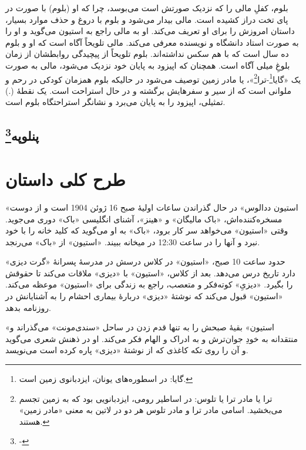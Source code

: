 \documentclass[12pt]{book}
\newcommand{\noun}[1]{«{#1}»}
\begin{document}
    بلوم، کفلِ مالی را که نزدیک صورتش است می‌بوسد، چرا که او (بلوم) با صورت در پای تخت دراز کشیده است. مالی بیدار می‌شود و بلوم با دروغ و حذف موارد بسیار، داستان امروزش را برای او تعریف می‌کند. او به مالی راجع به استیون می‌گوید و او را به صورت استاد دانشگاه و نویسنده معرفی می‌کند. مالی تلویحاً آگاه است  که او و بلوم ده سال است که با هم سکس نداشته‌اند. بلوم تلویحاً از پیچیدگی روابطشان از زمان بلوغِ میلی آگاه است. همچنان که اپیزود به پایان خود نزدیک می‌شود، مالی به صورت یک «گایا\footnote{گایا: در اسطوره‌های یونان، ایزدبانوی زمین است.}-ترا\footnote{ترا یا مادر ترا یا تلوس: در اساطیر رومی، ایزدبانویی بود که به زمین تجسم می‌بخشید. اسامی مادر ترا و مادر تلوس هر دو در لاتین به معنی «مادر زمین» هستند.}»، یا مادر زمین توصیف می‌شود در حالیکه بلوم همزمان کودکی در رحم و ملوانی است که از سیر و سفرهایش برگشته و در حال استراحت است. یک نقطۀ (.) تمثیلی، اپیزود را به پایان می‌برد و نشانگر استراحتگاه بلوم است.

    \chapter[پنلوپه]{پنلوپه\protect\footnote{-}}\label{ep:18}

    \part{طرح کلی داستان}
    \noun{استیون ددالوس} در حال گذراندن ساعات اولیۀ صبح 16 ژوئن 1904 است و از دوست مسخره‌کننده‌اش، \noun{باک مالیگان} و \noun{هینز}، آشنای انگلیسی \noun{باک} دوری می‌جوید. وقتی \noun{استیون} می‌خواهد سر کار برود، \noun{باک} به او می‌گوید که کلید خانه را با خود نبرد و آنها را در ساعت 12:30 در میخانه ببیند. \noun{استیون} از \noun{باک} می‌رنجد.

    حدود ساعت 10 صبح، \noun{استیون} در کلاس درسش در مدرسۀ پسرانۀ \noun{گرت دیزی} دارد تاریخ درس می‌دهد. بعد از کلاس، \noun{استیون} با \noun{دیزی} ملاقات می‌کند تا حقوقش را بگیرد. \noun{دیزیِ} کوته‌فکر و متعصب، راجع به زندگی برای \noun{استیون} موعظه می‌کند. \noun{استیون} قبول می‌کند که نوشتۀ \noun{دیزی} دربارۀ بیماری احشام را به آشنایانش در روزنامه بدهد.

    \noun{استیون} بقیۀ صبحش را به تنها قدم زدن در ساحل \noun{سندی‌مونت} می‌گذراند و منتقدانه به خودِ جوان‌ترش و به ادراک و الهام فکر می‌کند. او در ذهنش شعری می‌گوید و آن را روی تکه کاغذی که از نوشتۀ \noun{دیزی} پاره کرده است می‌نویسد.
\end{document}
